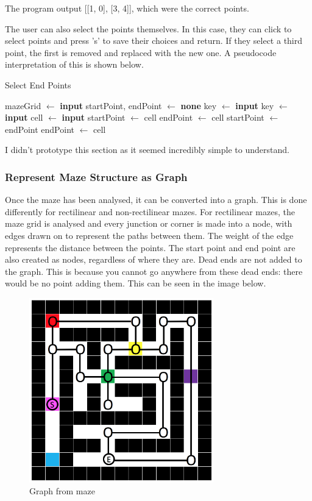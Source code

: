 \documentclass[titlepage]{article}
\begin{document}
The program output [[1, 0], [3, 4]], which were the correct points.

The user can also select the points themselves. In this case, they can click to select points and press 's' to save their choices and return. If they select a third point, the first is removed and replaced with the new one. A pseudocode interpretation of this is shown below.

\begin{algorithm}[H]
\caption{Select End Points}
\begin{algorithmic}[1]
    	\State mazeGrid $\gets$ \textbf{input}
    	\State startPoint, endPoint $\gets$ \textbf{none}
	\State key $\gets$ \textbf{input}
		\State key $\gets$ \textbf{input}
		\State cell $\gets$ \textbf{input}
				\State startPoint $\gets$ cell
				\State endPoint $\gets$ cell
			\Else
				\State startPoint $\gets$ endPoint
				\State endPoint $\gets$ cell
			\EndIf
		\EndIf
	\EndWhile
\end{algorithmic}
\end{algorithm}

I didn't prototype this section as it seemed incredibly simple to understand.

\subsubsection{Represent Maze Structure as Graph}

Once the maze has been analysed, it can be converted into a graph. This is done differently for rectilinear and non-rectilinear mazes. For rectilinear mazes, the maze grid is analysed and every junction or corner is made into a node, with edges drawn on to represent the paths between them. The weight of the edge represents the distance between the points. The start point and end point are also created as nodes, regardless of where they are. Dead ends are not added to the graph. This is because you cannot go anywhere from these dead ends: there would be no point adding them.  This can be seen in the image below.

\begin{figure}[H]
  \centering
  \includegraphics[width=8cm]{nbrs.png}
  \caption{Graph from maze}
  \label{fig:dijk}
\end{figure}
\end{document}
